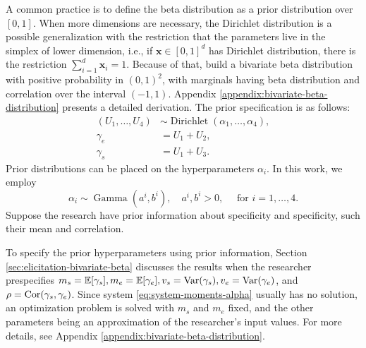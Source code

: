A common practice is to define the beta distribution as a prior distribution
over $[0,1]$. When more dimensions are necessary, the Dirichlet distribution
is a possible generalization with the restriction that the parameters live in
the simplex of lower dimension, i.e., if $\boldsymbol{x} \in [0,1]^d$ has Dirichlet
distribution, there is the restriction $\sum_{i=1}^d \boldsymbol{x}_i = 1$.
Because of that, \textcite{olkin2015constructions} build a bivariate beta distribution
with positive probability in $(0,1)^2$, with marginals having beta
distribution and correlation over the interval $(-1,1)$. Appendix
\ref{appendix:bivariate-beta-distribution} presents a detailed derivation. The
prior specification is as follows: 
\begin{equation*}
  \begin{aligned}
    (U_1, \dots, U_4) &\sim \operatorname{Dirichlet}(\alpha_1, \dots, \alpha_4), \\
    \gamma_e &= U_1 + U_2, \\
    \gamma_s &= U_1 + U_3.
  \end{aligned}
\end{equation*}
Prior distributions can be placed on the hyperparameters $\alpha_i$. In this work,
we employ 
\begin{equation*}
  \alpha_i \sim \operatorname{Gamma}(a^i, b^i), \quad a^i, b^i > 0, \quad \text{ for } i = 1,\dots,4. 
\end{equation*}
Suppose the research have prior information about specificity and specificity,
such their mean and correlation. 

To specify the prior hyperparameters using prior information, Section
\ref{sec:elicitation-bivariate-beta} discusses the results when the
researcher prespecifies $m_s = \mathbb{E}[\gamma_s], m_e = \mathbb{E}[\gamma_e], v_s = \operatorname{Var}(\gamma_s),
v_e = \operatorname{Var}(\gamma_e)$, and $\rho  = \operatorname{Cor}(\gamma_s, \gamma_e)$. Since system
\eqref{eq:system-moments-alpha} usually has no solution, an optimization
problem is solved with $m_s$ and $m_e$ fixed, and the other parameters being
an approximation of the researcher's input values. For more details, see Appendix \ref{appendix:bivariate-beta-distribution}.

